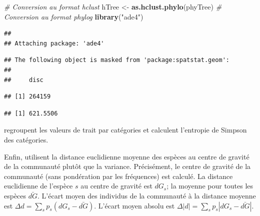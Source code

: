 \documentclass[
  11pt,
  french,
  a4paper,
  extrafontsizes,onecolumn,openright
  ]{memoir}
\newenvironment{Shaded}{\begin{snugshade}}{\end{snugshade}}
\newcommand{\CommentTok}[1]{\textcolor[rgb]{0.56,0.35,0.01}{\textit{#1}}}
\newcommand{\DecValTok}[1]{\textcolor[rgb]{0.00,0.00,0.81}{#1}}
\newcommand{\KeywordTok}[1]{\textcolor[rgb]{0.13,0.29,0.53}{\textbf{#1}}}
\newcommand{\NormalTok}[1]{#1}
\newcommand{\OperatorTok}[1]{\textcolor[rgb]{0.81,0.36,0.00}{\textbf{#1}}}
\newcommand{\StringTok}[1]{\textcolor[rgb]{0.31,0.60,0.02}{#1}}
\begin{document}
\begin{Shaded}
\begin{Highlighting}[]
\CommentTok{# Conversion au format hclust}
\NormalTok{hTree <-}\StringTok{ }\KeywordTok{as.hclust.phylo}\NormalTok{(phyTree)}
\CommentTok{# Conversion au format phylog}
\KeywordTok{library}\NormalTok{(}\StringTok{"ade4"}\NormalTok{)}
\end{Highlighting}
\end{Shaded}

\begin{verbatim}
## 
## Attaching package: 'ade4'
\end{verbatim}

\begin{verbatim}
## The following object is masked from 'package:spatstat.geom':
## 
##     disc
\end{verbatim}

\begin{Shaded}
\end{Shaded}

\begin{verbatim}
## [1] 264159
\end{verbatim}

\begin{Shaded}
\end{Shaded}

\begin{verbatim}
## [1] 621.5506
\end{verbatim}

\normalsize

\textcite{Kader2007} regroupent les valeurs de trait par catégories et calculent l'entropie de Simpson des catégories.

Enfin, \textcite{Villeger2008a} utilisent la distance euclidienne moyenne des espèces au centre de gravité de la communauté plutôt que la variance.
Précisément, le centre de gravité de la communauté (sans pondération par les fréquences) est calculé.
La distance euclidienne de l'espèce \(s\) au centre de gravité est \(dG_s\); la moyenne pour toutes les espèces \(\bar{dG}\).
L'écart moyen des individus de la communauté à la distance moyenne est \(\Delta d=\sum_s{p_s(dG_s - \bar{dG})}\).
L'écart moyen absolu est \(\Delta |d|=\sum_s{p_s|dG_s - \bar{dG}|}\).
\end{document}
